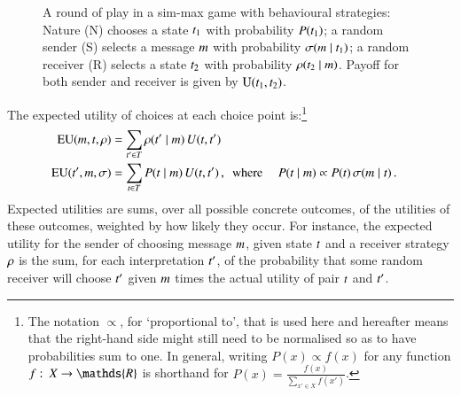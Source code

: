 \documentclass[11pt,english]{article}
\newcommand{\similarity}{\ensuremath{\mathrm{Sim}}} %
\renewcommand{\Pr}{\ensuremath{P}}
\numberwithin{equation}{section}
\begin{document}
\begin{figure}
  \centering


  \caption{A round of play in a sim-max game with behavioural strategies: Nature (N) chooses a
    state $t_{\mathrm{1}}$ with probability $\Pr(\mystate{1})$; a random sender (S) selects a
    message $m$ with probability $\sigma(m \mid t_{\mathrm{1}})$; a random receiver
    (R) selects a state $t_{\mathrm{2}}$ with probability $\rho(t_{\mathrm{2}} \mid m)$.
    Payoff for both sender and receiver is given by $\mathrm{U}(t_{\mathrm{1}}, t_{\mathrm{2}})$.}
  \label{fig:sim-max-illustration}
\end{figure}

The expected utility of choices at each choice point is:\footnote{The notation
  $\propto$, for `proportional to', that is used here and hereafter means that the right-hand
  side might still need to be normalised so as to have probabilities sum to one. In general,
  writing $P(x) \propto f(x)$ for any function $f \mycolon X \rightarrow \mathds{R}$ is
  shorthand for $P(x) = \frac{f(x)}{\sum_{x' \in X} f(x')}$. }
\begin{align*}
  \EU(\messg, \state, \Rstrat) & = \sum_{\state' \in \States}
  \Rstrat(\state' \probbar \messg) \myts U(\state, \state') \\
  \EU(\state', \messg, \Sstrat) & = \sum_{\state \in
    \States} P(\state \probbar \messg)  \myts
  U(\state, \state')\,, \text{\ \  where } &
P(\state \probbar \messg) & \propto \Pr(\state) \myts \Sstrat(\messg \probbar \state) \,.
\end{align*}
Expected utilities are sums, over all possible concrete outcomes, of the utilities of these
outcomes, weighted by how likely they occur. For instance, the expected utility for the sender
of choosing message $m$, given state $t$ and a receiver strategy $\rho$ is the
sum, for each interpretation $t'$, of the probability that some random receiver will
choose $t'$ given $m$ times the actual utility of pair $t$ and
$t'$.
\end{document}
